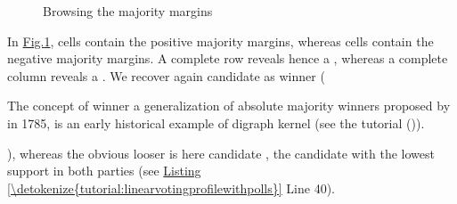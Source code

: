 \documentclass[a4paper,12pt,english]{sphinxhowto}
\let\sphinxpxdimen\pdfpxdimen\else\newdimen\sphinxpxdimen
\begin{document}
\begin{figure}[H]
\centering
\capstart

\noindent\sphinxincludegraphics[width=450\sphinxpxdimen]{{majorityMargins}.png}
\caption{Browsing the majority margins}\label{\detokenize{tutorial:majoritymargins}}\end{figure}

In \hyperref[\detokenize{tutorial:majoritymargins}]{Fig.\@ \ref{\detokenize{tutorial:majoritymargins}}},  cells contain the positive majority margins, whereas  cells contain the negative majority margins. A complete  row reveals hence a  , whereas a complete  column reveals a  . We recover again candidate  as  winner (%
\begin{footnote}[15]\sphinxAtStartFootnote
The concept of  winner \sphinxhyphen{}a generalization of absolute majority winners\sphinxhyphen{} proposed by  in 1785, is an early historical example of  digraph kernel (see the tutorial {\hyperref[\detokenize{tutorial:kernel-tutorial-label}]{}} ()).
%
\end{footnote}), whereas the obvious  looser is here candidate , the candidate with the lowest support in both parties (see \hyperref[\detokenize{tutorial:linearvotingprofilewithpolls}]{Listing \ref{\detokenize{tutorial:linearvotingprofilewithpolls}}} Line 40).
\end{document}
